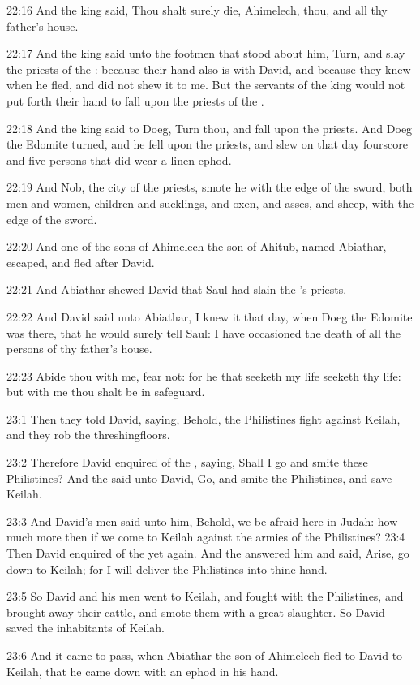 22:16 And the king said, Thou shalt surely die, Ahimelech, thou, and
all thy father's house.

22:17 And the king said unto the footmen that stood about him, Turn,
and slay the priests of the \LORD: because their hand also is with
David, and because they knew when he fled, and did not shew it to me.
But the servants of the king would not put forth their hand to fall
upon the priests of the \LORD.

22:18 And the king said to Doeg, Turn thou, and fall upon the priests.
And Doeg the Edomite turned, and he fell upon the priests, and slew on
that day fourscore and five persons that did wear a linen ephod.

22:19 And Nob, the city of the priests, smote he with the edge of the
sword, both men and women, children and sucklings, and oxen, and
asses, and sheep, with the edge of the sword.

22:20 And one of the sons of Ahimelech the son of Ahitub, named
Abiathar, escaped, and fled after David.

22:21 And Abiathar shewed David that Saul had slain the \LORD's
priests.

22:22 And David said unto Abiathar, I knew it that day, when Doeg the
Edomite was there, that he would surely tell Saul: I have occasioned
the death of all the persons of thy father's house.

22:23 Abide thou with me, fear not: for he that seeketh my life
seeketh thy life: but with me thou shalt be in safeguard.

23:1 Then they told David, saying, Behold, the Philistines fight
against Keilah, and they rob the threshingfloors.

23:2 Therefore David enquired of the \LORD, saying, Shall I go and
smite these Philistines? And the \LORD said unto David, Go, and smite
the Philistines, and save Keilah.

23:3 And David's men said unto him, Behold, we be afraid here in
Judah: how much more then if we come to Keilah against the armies of
the Philistines?  23:4 Then David enquired of the \LORD yet again. And
the \LORD answered him and said, Arise, go down to Keilah; for I will
deliver the Philistines into thine hand.

23:5 So David and his men went to Keilah, and fought with the
Philistines, and brought away their cattle, and smote them with a
great slaughter. So David saved the inhabitants of Keilah.

23:6 And it came to pass, when Abiathar the son of Ahimelech fled to
David to Keilah, that he came down with an ephod in his hand.

